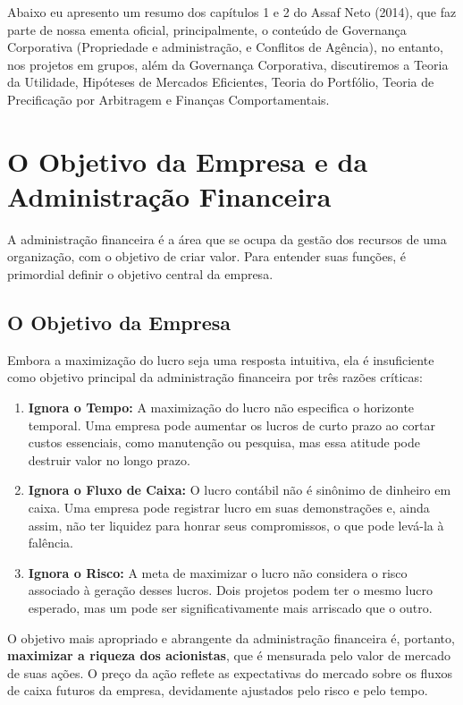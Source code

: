 \documentclass[
  a4paper,
]{book}
\providecommand{\tightlist}{%
  \setlength{\itemsep}{0pt}\setlength{\parskip}{0pt}}\usepackage{longtable,booktabs,array}
\begin{document}
Abaixo eu apresento um resumo dos capítulos 1 e 2 do Assaf Neto (2014),
que faz parte de nossa ementa oficial, principalmente, o conteúdo de
Governança Corporativa (Propriedade e administração, e Conflitos de
Agência), no entanto, nos projetos em grupos, além da Governança
Corporativa, discutiremos a Teoria da Utilidade, Hipóteses de Mercados
Eficientes, Teoria do Portfólio, Teoria de Precificação por Arbitragem e
Finanças Comportamentais.

\section{O Objetivo da Empresa e da Administração
Financeira}\label{o-objetivo-da-empresa-e-da-administrauxe7uxe3o-financeira}

A administração financeira é a área que se ocupa da gestão dos recursos
de uma organização, com o objetivo de criar valor. Para entender suas
funções, é primordial definir o objetivo central da empresa.

\subsection{O Objetivo da Empresa}\label{o-objetivo-da-empresa}

Embora a maximização do lucro seja uma resposta intuitiva, ela é
insuficiente como objetivo principal da administração financeira por
três razões críticas:

\begin{enumerate}
\def\labelenumi{\arabic{enumi}.}
\tightlist
\item
  \textbf{Ignora o Tempo:} A maximização do lucro não especifica o
  horizonte temporal. Uma empresa pode aumentar os lucros de curto prazo
  ao cortar custos essenciais, como manutenção ou pesquisa, mas essa
  atitude pode destruir valor no longo prazo.
\item
  \textbf{Ignora o Fluxo de Caixa:} O lucro contábil não é sinônimo de
  dinheiro em caixa. Uma empresa pode registrar lucro em suas
  demonstrações e, ainda assim, não ter liquidez para honrar seus
  compromissos, o que pode levá-la à falência.
\item
  \textbf{Ignora o Risco:} A meta de maximizar o lucro não considera o
  risco associado à geração desses lucros. Dois projetos podem ter o
  mesmo lucro esperado, mas um pode ser significativamente mais
  arriscado que o outro.
\end{enumerate}

O objetivo mais apropriado e abrangente da administração financeira é,
portanto, \textbf{maximizar a riqueza dos acionistas}, que é mensurada
pelo valor de mercado de suas ações. O preço da ação reflete as
expectativas do mercado sobre os fluxos de caixa futuros da empresa,
devidamente ajustados pelo risco e pelo tempo.
\end{document}
